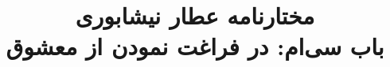 \documentclass[14pt,b5paper]{article}
\begin{document}
\title{\Huge مختارنامه عطار نیشابوری \\
باب سی‌ام: در فراغت نمودن از معشوق}
\author{ }
\date{ }
\maketitle
\newpage
\tableofcontents
\newpage

\newpage

\newpage

\newpage

\newpage

\newpage

\newpage

\newpage

\newpage

\newpage

\newpage

\newpage

\newpage

\newpage

\newpage

\newpage

\newpage

\newpage

\newpage

\newpage

\newpage

\newpage

\newpage

\newpage

\newpage

\newpage

\newpage

\newpage

\newpage

\newpage

\newpage

\newpage
\end{document}
